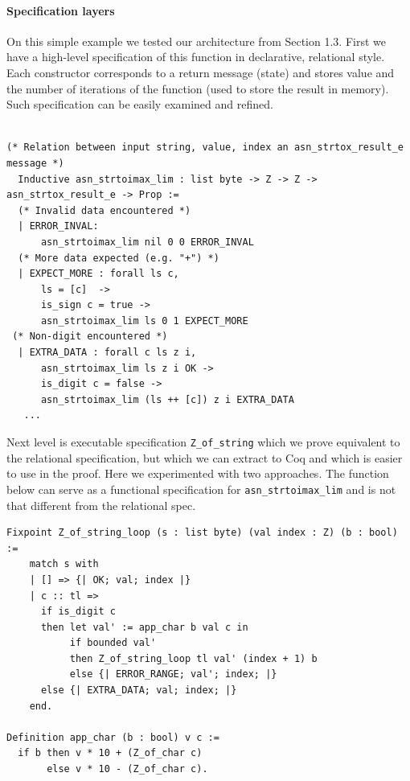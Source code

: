 \documentclass[acmsmall,nonacm]{acmart}
\begin{document}
\paragraph{Specification layers} On this simple example we tested our architecture from Section 1.3. First we have a high-level specification of this function in declarative, relational style. Each constructor corresponds to a return message (state) and stores value and the number of iterations of the function (used to store the result in memory). Such specification can be easily examined and refined.

 \begin{lstlisting}[language=Coq]

(* Relation between input string, value, index an asn_strtox_result_e message *)
  Inductive asn_strtoimax_lim : list byte -> Z -> Z -> asn_strtox_result_e -> Prop :=
  (* Invalid data encountered *)
  | ERROR_INVAL:
      asn_strtoimax_lim nil 0 0 ERROR_INVAL
  (* More data expected (e.g. "+") *)
  | EXPECT_MORE : forall ls c,
      ls = [c]  ->
      is_sign c = true ->
      asn_strtoimax_lim ls 0 1 EXPECT_MORE
 (* Non-digit encountered *)
  | EXTRA_DATA : forall c ls z i,
      asn_strtoimax_lim ls z i OK ->
      is_digit c = false -> 
      asn_strtoimax_lim (ls ++ [c]) z i EXTRA_DATA
   ...    
  \end{lstlisting}

Next level is executable specification \texttt{Z\_of\_string} which we prove equivalent to the relational specification, but which we can extract to Coq and which is easier to use in the proof. Here we experimented with two approaches. The function below can serve as a functional specification for \texttt{asn\_strtoimax\_lim} and is not that different from the relational spec.

 \begin{lstlisting}[language=Coq]
Fixpoint Z_of_string_loop (s : list byte) (val index : Z) (b : bool) := 
    match s with 
    | [] => {| OK; val; index |}
    | c :: tl => 
      if is_digit c
      then let val' := app_char b val c in 
           if bounded val'
           then Z_of_string_loop tl val' (index + 1) b
           else {| ERROR_RANGE; val'; index; |}      
      else {| EXTRA_DATA; val; index; |}              
    end.

Definition app_char (b : bool) v c := 
  if b then v * 10 + (Z_of_char c) 
       else v * 10 - (Z_of_char c).
 \end{lstlisting}
\end{document}
